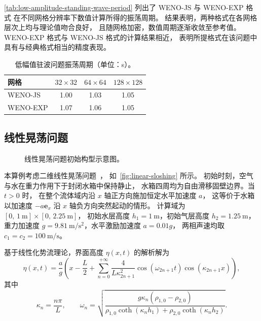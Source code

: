 \documentclass[12pt,a4paper]{article}
\numberwithin{equation}{section}    %
\begin{document}
\autoref{tab:low-amplitude-standing-wave-period} 列出了 WENO-JS 与 WENO-EXP 格式
在不同网格分辨率下数值计算所得的振荡周期。
结果表明，两种格式在各网格层次上均与理论值吻合良好，
且随网格加密，数值周期逐渐收敛至参考值。
WENO-EXP 格式与 WENO-JS 格式的计算结果相近，
表明所提格式在该问题中具有与经典格式相当的精度表现。

\begin{table}[!htbp]
    \centering
    \caption{低幅值驻波问题振荡周期（单位：s）。}
    \label{tab:low-amplitude-standing-wave-period}
    \begin{tabular}{lccc}
        \toprule
        网格 & $32 \times 32$ & $64 \times 64$ & $128 \times 128$ \\
        \midrule
        WENO-JS  & 1.00 & 1.03 & 1.05 \\
        WENO-EXP & 1.07 & 1.06 & 1.05 \\
        \bottomrule
    \end{tabular}
\end{table}

\subsection{线性晃荡问题}

\begin{figure}[!htbp]
    \centering
    
    \caption{线性晃荡问题初始构型示意图。}
    \label{fig:linear-sloshing}
\end{figure}

本算例考虑二维线性晃荡问题~\cite{Chanteperdrix2004,grenier2013accurate}，
如~\autoref{fig:linear-sloshing} 所示。
初始时刻，空气与水在重力作用下于封闭水箱中保持静止，
水箱四周均为自由滑移固壁边界。当 $t > 0$ 时，
在整个流体域内沿 $x$ 轴正方向施加恒定水平加速度 $a$，
这等价于水箱以加速度 $-a\bm{e}_x$ 沿 $x$ 轴负方向突然起动的情形。
计算域为 $[0,\,1~\mathrm{m}] \times [0,\,2.25~\mathrm{m}]$，
初始水层高度 $h_1 = 1~\mathrm{m}$，初始气层高度 $h_2 = 1.25~\mathrm{m}$，
重力加速度 $g = 9.81~\mathrm{m/s^2}$，水平激励加速度 $a = 0.01g$，
两相声速均取 $c_1 = c_2 = 100~\mathrm{m/s}$。

基于线性化势流理论，界面高度 $\eta(x, t)$ 的解析解为~\cite{Chanteperdrix2004,grenier2013accurate}
\begin{equation}
    \eta(x, t) = \frac{a}{g}\left(
        x - \frac{L}{2}
        + \sum_{n=0}^{+\infty} \frac{4}{L\kappa_{2n+1}^2}
          \cos(\omega_{2n+1}t)\cos(\kappa_{2n+1}x)
    \right),
\end{equation}
其中
\begin{equation}
    \kappa_n = \frac{n\pi}{L},
    \qquad
    \omega_n = \sqrt{\frac{g\kappa_n(\rho_{1,0} - \rho_{2,0})}
                         {\rho_{1,0}\coth(\kappa_n h_1)
                          + \rho_{2,0}\coth(\kappa_n h_2)}}.
\end{equation}
\end{document}
